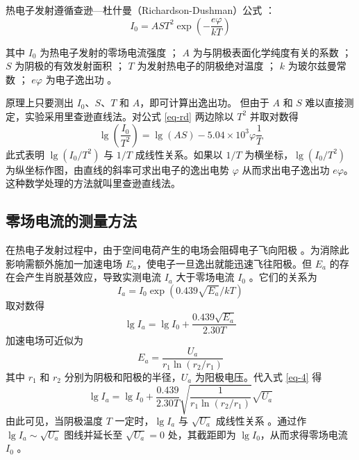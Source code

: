 \documentclass{../template/myrpt}
\begin{document}
热电子发射遵循查逊—杜什曼（Richardson-Dushman）公式 ：
\begin{equation}
I_0 = A S T^2 \exp\left({-\frac{e\varphi}{kT}}\right) \label{eq-rd}
\end{equation}

其中 $I_0$ 为热电子发射的零场电流强度 ；
   $A$ 为与阴极表面化学纯度有关的系数 ；
   $S$ 为阴极的有效发射面积 ；
   $T$ 为发射热电子的阴极绝对温度 ；
   $k$ 为玻尔兹曼常数 ；
   $e\varphi$ 为电子逸出功 。

原理上只要测出 $I_0$、$S$、$T$ 和 $A$，即可计算出逸出功。
但由于 $A$ 和 $S$ 难以直接测定，实验采用里查逊直线法。对公式 \ref{eq-rd} 两边除以 $T^2$ 并取对数得
$$
\lg\left(\frac{I_0}{T^2}\right) = \lg(AS) - 5.04\times10^3 \varphi \frac{1}{T}
$$
此式表明 $\lg(I_0/T^2)$ 与 $1/T$ 成线性关系。如果以 $1/T$ 为横坐标，$\lg(I_0/T^2)$ 为纵坐标作图，由直线的斜率可求出电子的逸出电势 $\varphi$ 从而求出电子逸出功 $e\varphi$。这种数学处理的方法就叫里查逊直线法。

\subsection{零场电流的测量方法}

在热电子发射过程中，由于空间电荷产生的电场会阻碍电子飞向阳极 。为消除此影响需额外施加一加速电场 $E_a$，使电子一旦逸出就能迅速飞往阳极。但 $E_a$ 的存在会产生肖脱基效应，导致实测电流 $I_a$ 大于零场电流 $I_0$ 。它们的关系为
$$
I_a = I_0 \exp\left({0.439\sqrt{E_a}/kT}\right)
$$
取对数得
\begin{equation}
\lg I_a = \lg I_0 + \frac{0.439\sqrt{E_a}}{2.30T} \label{eq-4}
\end{equation}
加速电场可近似为
$$
E_a= \frac{U_a}{r_1 \ln(r_2/r_1)}
$$
其中 $r_1$ 和 $r_2$ 分别为阴极和阳极的半径，$U_a$ 为阳极电压。代入式 \ref{eq-4} 得
$$
\lg I_a = \lg I_0 + \frac{0.439}{2.30T}\sqrt{\frac{1}{r_1 \ln(r_2/r_1)}}\sqrt{U_a}
$$
由此可见，当阴极温度 $T$ 一定时，$\lg I_a$ 与 $\sqrt{U_a}$ 成线性关系 。通过作 $\lg I_a \sim \sqrt{U_a}$ 图线并延长至 $\sqrt{U_a}=0$ 处，其截距即为 $\lg I_0$，从而求得零场电流 $I_0$ 。
\end{document}
